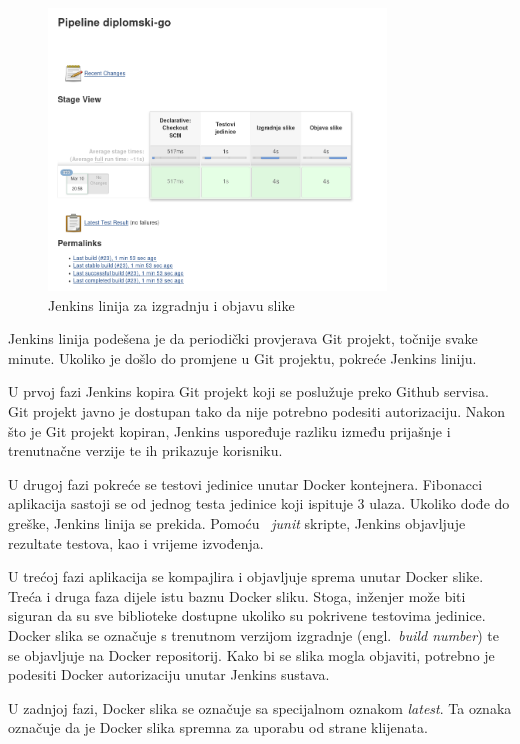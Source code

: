 \begin{figure}
    \centering
    \includegraphics[width=0.8\textwidth]{img/03/jenkins_pipeline.png}
    \caption{Jenkins linija za izgradnju i objavu slike}%
    \label{fig:03jenkins_pipeline}
\end{figure}

Jenkins linija podešena je da periodički provjerava Git projekt, točnije svake minute. Ukoliko je
došlo do promjene u Git projektu, pokreće Jenkins liniju.

U prvoj fazi Jenkins kopira Git projekt koji se poslužuje preko Github servisa. Git projekt javno je
dostupan tako da nije potrebno podesiti autorizaciju. Nakon što je Git projekt kopiran, Jenkins
uspoređuje razliku između prijašnje i trenutnačne verzije te ih prikazuje korisniku.

U drugoj fazi pokreće se testovi jedinice unutar Docker kontejnera. Fibonacci aplikacija sastoji se
od jednog testa jedinice koji ispituje 3 ulaza. Ukoliko dođe do greške, Jenkins linija se prekida.
Pomoću ~\textit{junit} skripte, Jenkins objavljuje rezultate testova, kao i vrijeme izvođenja.

U trećoj fazi aplikacija se kompajlira i objavljuje sprema unutar Docker slike. Treća i druga faza
dijele istu baznu Docker sliku. Stoga, inženjer može biti siguran da su sve biblioteke dostupne
ukoliko su pokrivene testovima jedinice. Docker slika se označuje s trenutnom verzijom izgradnje
(engl.~\textit{build number}) te se objavljuje na Docker repositorij. Kako bi se slika mogla
objaviti, potrebno je podesiti Docker autorizaciju unutar Jenkins sustava.

U zadnjoj fazi, Docker slika se označuje sa specijalnom oznakom \textit{latest}. Ta oznaka označuje
da je Docker slika spremna za uporabu od strane klijenata.

